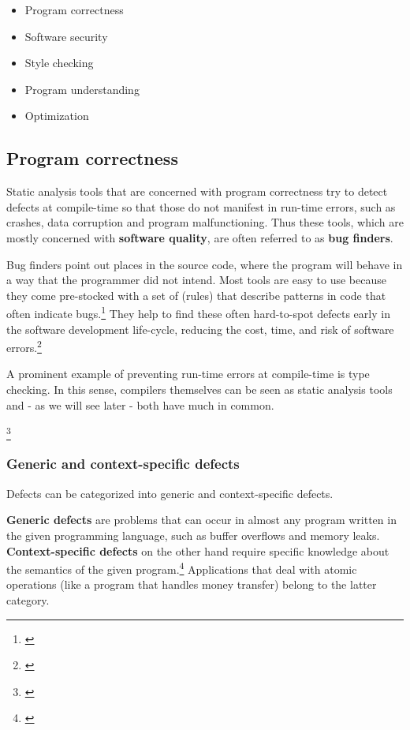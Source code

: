 \begin{itemize}\addtolength{\itemsep}{-0.5\baselineskip}
\item Program correctness
\item Software security
\item Style checking
\item Program understanding
\item Optimization
\end{itemize}

\subsection{Program correctness}

Static analysis tools that are concerned with program correctness try to detect defects at compile-time so that those do not manifest in run-time errors, such as crashes, data corruption and program malfunctioning. Thus these tools, which are mostly concerned with \textbf{software quality}, are often referred to as \textbf{bug finders}.

Bug finders point out places in the source code, where the program will behave in a way that the programmer did not intend. Most tools are easy to use because they come pre-stocked with a set of  (rules) that describe patterns in code that often indicate bugs.\footnote{\citep[32]{SecureProgramming}} They help to find these often hard-to-spot defects early in the software development life-cycle, reducing the cost, time, and risk of software errors.\footnote{\citep{CovertySA}}

A prominent example of preventing run-time errors at compile-time is type checking. In this sense, compilers themselves can be seen as static analysis tools and - as we will see later - both have much in common.

\footnote{\citep[1]{UsingSAToFindBugs}}

\subsubsection{Generic and context-specific defects}

Defects can be categorized into generic and context-specific defects.

\textbf{Generic defects} are problems that can occur in almost any program written in the given programming language, such as buffer overflows and memory leaks.\\
\textbf{Context-specific defects} on the other hand require specific knowledge about the semantics of the given program.\footnote{\citep[14]{SecureProgramming}} Applications that deal with atomic operations (like a program that handles money transfer) belong to the latter category.

